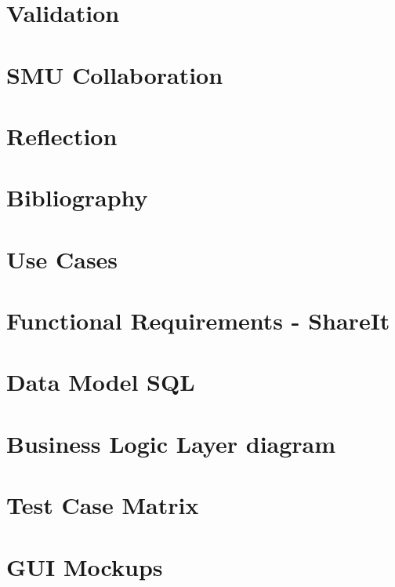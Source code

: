 \documentclass{report}
\begin{document}
\chapter{Validation}


\chapter{SMU Collaboration}


\chapter{Reflection}


\chapter{Bibliography}


\appendix

\chapter{Use Cases}


\chapter{Functional Requirements - ShareIt}
\label{app:FR-ShareIt}


\chapter{Data Model SQL}
\label{app:sql}


\chapter{Business Logic Layer diagram}


\newpage
\restoregeometry

\chapter{Test Case Matrix}
\label{app:testcasematrix}


\chapter{GUI Mockups}
\label{app:mockups}

\end{document}
